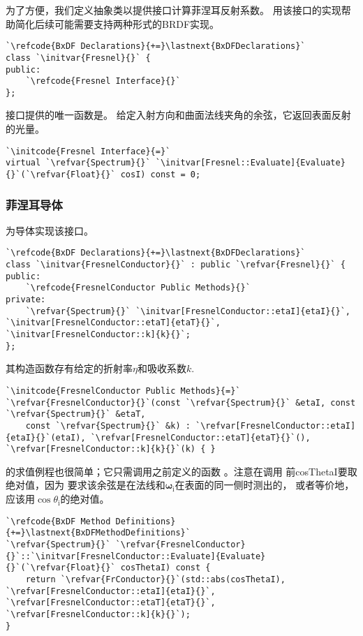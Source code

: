 为了方便，我们定义抽象类以提供接口计算菲涅耳反射系数。
用该接口的实现帮助简化后续可能需要支持两种形式的BRDF实现。
\begin{lstlisting}
`\refcode{BxDF Declarations}{+=}\lastnext{BxDFDeclarations}`
class `\initvar{Fresnel}{}` {
public:
    `\refcode{Fresnel Interface}{}`
};
\end{lstlisting}

接口提供的唯一函数是。
给定入射方向和曲面法线夹角的余弦，它返回表面反射的光量。
\begin{lstlisting}
`\initcode{Fresnel Interface}{=}`
virtual `\refvar{Spectrum}{}` `\initvar[Fresnel::Evaluate]{Evaluate}{}`(`\refvar{Float}{}` cosI) const = 0;
\end{lstlisting}

\subsubsection*{菲涅耳导体}
为导体实现该接口。
\begin{lstlisting}
`\refcode{BxDF Declarations}{+=}\lastnext{BxDFDeclarations}`
class `\initvar{FresnelConductor}{}` : public `\refvar{Fresnel}{}` {
public:
    `\refcode{FresnelConductor Public Methods}{}`
private:
    `\refvar{Spectrum}{}` `\initvar[FresnelConductor::etaI]{etaI}{}`, `\initvar[FresnelConductor::etaT]{etaT}{}`, `\initvar[FresnelConductor::k]{k}{}`;
};
\end{lstlisting}

其构造函数存有给定的折射率$\eta$和吸收系数$k$.
\begin{lstlisting}
`\initcode{FresnelConductor Public Methods}{=}`
`\refvar{FresnelConductor}{}`(const `\refvar{Spectrum}{}` &etaI, const `\refvar{Spectrum}{}` &etaT,
    const `\refvar{Spectrum}{}` &k) : `\refvar[FresnelConductor::etaI]{etaI}{}`(etaI), `\refvar[FresnelConductor::etaT]{etaT}{}`(), `\refvar[FresnelConductor::k]{k}{}`(k) { }
\end{lstlisting}

的求值例程也很简单；它只需调用之前定义的函数
。注意在调用
前{\ttfamily cosThetaI}要取绝对值，因为
要求该余弦是在法线和${\bm\omega}_{\mathrm{i}}$在表面的同一侧时测出的，
或者等价地，应该用$\cos\theta_{\mathrm{i}}$的绝对值。
\begin{lstlisting}
`\refcode{BxDF Method Definitions}{+=}\lastnext{BxDFMethodDefinitions}`
`\refvar{Spectrum}{}` `\refvar{FresnelConductor}{}`::`\initvar[FresnelConductor::Evaluate]{Evaluate}{}`(`\refvar{Float}{}` cosThetaI) const {
    return `\refvar{FrConductor}{}`(std::abs(cosThetaI), `\refvar[FresnelConductor::etaI]{etaI}{}`, `\refvar[FresnelConductor::etaT]{etaT}{}`, `\refvar[FresnelConductor::k]{k}{}`);
}
\end{lstlisting}

